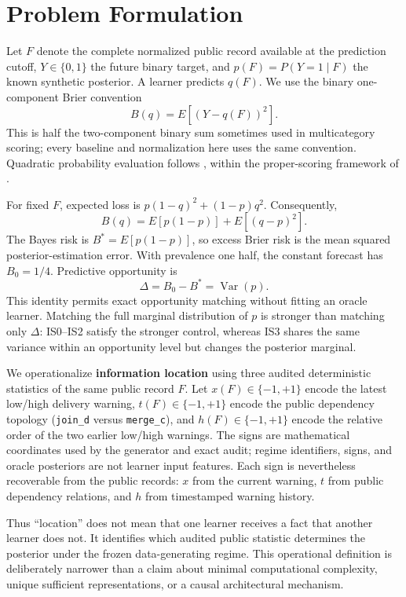 \documentclass[11pt]{article}
\begin{document}
\section{Problem Formulation}

Let $F$ denote the complete normalized public record available at the prediction cutoff, $Y\in\{0,1\}$ the future binary target, and $p(F)=P(Y=1\mid F)$ the known synthetic posterior. A learner predicts $q(F)$. We use the binary one-component Brier convention
\[
B(q)=E[(Y-q(F))^2].
\]
This is half the two-component binary sum sometimes used in multicategory scoring; every baseline and normalization here uses the same convention. Quadratic probability evaluation follows \citet{brier}, within the proper-scoring framework of \citet{proper}.

For fixed $F$, expected loss is $p(1-q)^2+(1-p)q^2$. Consequently,
\[
B(q)=E[p(1-p)]+E[(q-p)^2].
\]
The Bayes risk is $B^*=E[p(1-p)]$, so excess Brier risk is the mean squared posterior-estimation error. With prevalence one half, the constant forecast has $B_0=1/4$. Predictive opportunity is
\[
\Delta=B_0-B^*=\operatorname{Var}(p).
\]
This identity permits exact opportunity matching without fitting an oracle learner. Matching the full marginal distribution of $p$ is stronger than matching only $\Delta$: IS0--IS2 satisfy the stronger control, whereas IS3 shares the same variance within an opportunity level but changes the posterior marginal.

We operationalize \textbf{information location} using three audited deterministic statistics of the same public record $F$. Let $x(F)\in\{-1,+1\}$ encode the latest low/high delivery warning, $t(F)\in\{-1,+1\}$ encode the public dependency topology (\texttt{join\_d} versus \texttt{merge\_c}), and $h(F)\in\{-1,+1\}$ encode the relative order of the two earlier low/high warnings. The signs are mathematical coordinates used by the generator and exact audit; regime identifiers, signs, and oracle posteriors are not learner input features. Each sign is nevertheless recoverable from the public records: $x$ from the current warning, $t$ from public dependency relations, and $h$ from timestamped warning history.

Thus ``location'' does not mean that one learner receives a fact that another learner does not. It identifies which audited public statistic determines the posterior under the frozen data-generating regime. This operational definition is deliberately narrower than a claim about minimal computational complexity, unique sufficient representations, or a causal architectural mechanism.
\end{document}
